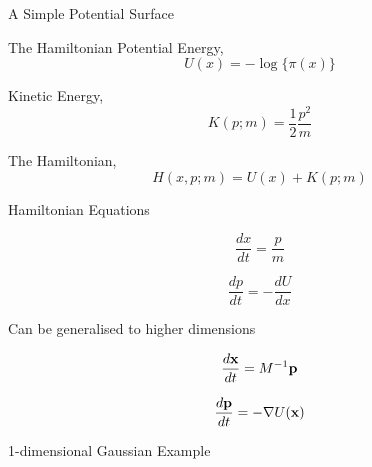 \documentclass{beamer}
\begin{document}
\begin{frame}{A Simple Potential Surface}

\begin{figure}
\centering
{}
\end{figure}
\end{frame}


\begin{frame}{The Hamiltonian}
Potential Energy,
\begin{equation*}
U(x) = - \log \{\pi(x)\}
\end{equation*}

Kinetic Energy,
\begin{equation*}
K(p; m) = \frac{1}{2} \frac{p^2}{m}
\end{equation*}

The Hamiltonian,
\begin{equation*}
H(x, p; m) = U(x) + K(p;m)
\end{equation*}
\end{frame}

\begin{frame}{Hamiltonian Equations}

\begin{equation*}
\frac{dx}{dt} = \frac{p}{m}
\end{equation*}

\begin{equation*}
\frac{dp}{dt} = - \frac{dU}{dx}
\end{equation*}

Can be generalised to higher dimensions

\begin{equation*}
\frac{d\bf{x}}{dt} = M^{-1}\bf{p}
\end{equation*}

\begin{equation*}
\frac{d\bf{p}}{dt} = - \nabla U(\bf{x})
\end{equation*}

\end{frame}

\begin{frame}{1-dimensional Gaussian Example}
\begin{figure}
\centering
{}
\end{figure}
\end{frame}
\end{document}
